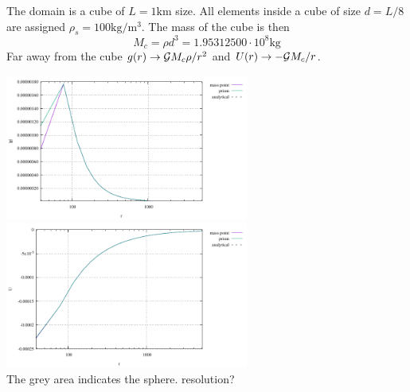 The domain is a cube of $L=1\si{\km}$ size. All elements inside a cube of size $d=L/8$ are assigned
$\rho_s=100\si{\kg\per\cubic\metre}$.
The mass of the cube is then
\[
M_c = \rho d^3 = 1.95312500\cdot 10^8 \si{\kg}
\]
Far away from the cube $g(r) \rightarrow {\cal G}M_c \rho/r^2$ and $U(r) \rightarrow -{\cal G} M_c/r$.

\begin{center}
\includegraphics[width=8cm]{python_codes/fieldstone_84/cube/gravnorm}
\includegraphics[width=8cm]{python_codes/fieldstone_84/cube/gravpot}\\
{\captionfont  The grey area indicates the sphere. resolution?}
\end{center}


